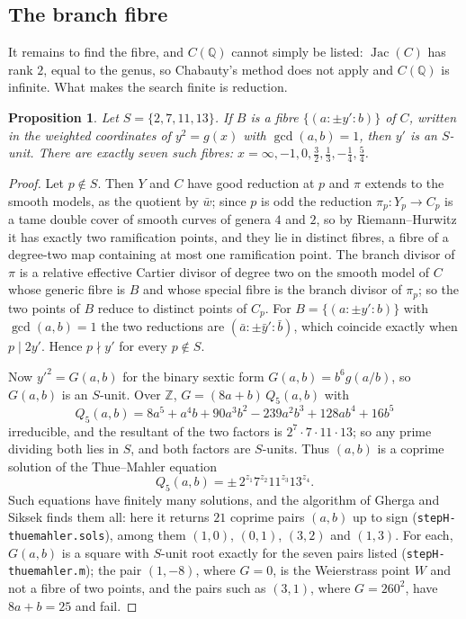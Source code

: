 \documentclass[11pt,reqno]{amsart}
\theoremstyle{plain}
\newtheorem{proposition}[theorem]{Proposition}
\theoremstyle{definition}
\DeclareMathOperator{\Jac}{Jac}
\newcommand{\Q}{\mathbb{Q}}
\newcommand{\Z}{\mathbb{Z}}
\begin{document}
\subsection*{The branch fibre}
It remains to find the fibre, and $C(\Q)$ cannot simply be listed: $\Jac(C)$ has rank $2$, equal to
the genus, so Chabauty's method does not apply and $C(\Q)$ is infinite. What makes the search
finite is reduction.

\begin{proposition}\label{prop:fibre}
Let $S=\{2,7,11,13\}$. If $B$ is a fibre $\{(a:\pm y':b)\}$ of $C$, written in the weighted
coordinates of $y^2=g(x)$ with $\gcd(a,b)=1$, then $y'$ is an $S$-unit. There are exactly seven such
fibres: $x=\infty,-1,0,\tfrac32,\tfrac13,-\tfrac14,\tfrac54$.
\end{proposition}

\begin{proof}
Let $p\notin S$. Then $Y$ and $C$ have good reduction at $p$ and $\pi$ extends to the smooth
models, as the quotient by $\bar w$; since $p$ is odd the reduction $\pi_p\colon Y_p\to C_p$ is a
tame double cover of smooth curves of genera $4$ and $2$, so by Riemann--Hurwitz it has exactly two
ramification points, and they lie in distinct fibres, a fibre of a degree-two map containing at most
one ramification point. The branch divisor of $\pi$ is a relative effective Cartier divisor of
degree two on the smooth model of $C$ whose generic fibre is $B$ and whose special fibre is the branch
divisor of $\pi_p$; so the two points of $B$ reduce to distinct points of $C_p$. For $B=\{(a:\pm y':
b)\}$ with $\gcd(a,b)=1$ the two reductions are $(\bar a:\pm\bar y':\bar b)$, which coincide exactly
when $p\mid 2y'$. Hence $p\nmid y'$ for every $p\notin S$.

Now $y'^2=G(a,b)$ for the binary sextic form $G(a,b)=b^6g(a/b)$, so $G(a,b)$ is an $S$-unit. Over
$\Z$, $G=(8a+b)\,Q_5(a,b)$ with
\[
  Q_5(a,b)=8a^5+a^4b+90a^3b^2-239a^2b^3+128ab^4+16b^5
\]
irreducible, and the resultant of the two factors is $2^7\cdot7\cdot11\cdot13$; so any prime
dividing both lies in $S$, and both factors are $S$-units. Thus $(a,b)$ is a coprime solution of
the Thue--Mahler equation
\[
  Q_5(a,b)=\pm\,2^{z_1}7^{z_2}11^{z_3}13^{z_4}.
\]
Such equations have finitely many solutions, and the algorithm of Gherga and Siksek \cite{gs} finds
them all: here it returns $21$ coprime pairs $(a,b)$ up to sign (\texttt{stepH-thuemahler.sols}),
among them $(1,0)$, $(0,1)$, $(3,2)$ and $(1,3)$. For each, $G(a,b)$ is a square with $S$-unit
root exactly for the seven pairs listed (\texttt{stepH-thuemahler.m}); the pair $(1,-8)$, where
$G=0$, is the Weierstrass point $W$ and not a fibre of two points, and the pairs such as $(3,1)$,
where $G=260^2$, have $8a+b=25$ and fail.
\end{proof}
\end{document}
